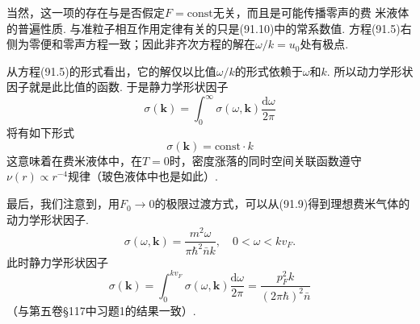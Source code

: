 当然，这一项的存在与是否假定$F=\mathrm{const}$无关，而且是可能传播零声的费
米液体的普遍性质. 与准粒子相互作用定律有关的只是(91.10)中的常系数值. 方程(91.5)右侧为零便和零声方程一致；因此非齐次方程的解在$\omega/k=u_{0}$处有极点.

从方程(91.5)的形式看出，它的解仅以比值$\omega/k$的形式依赖于$\omega$和$k$. 所以动力学形状因子就是此比值的函数. 于是静力学形状因子
\begin{equation*}
\sigma(\bm{k})=\int_{0}^{\infty}\sigma(\omega,\bm{k})\frac{\mathrm{d}\omega}{2\pi}
\end{equation*}
将有如下形式
\begin{equation}
\sigma(\bm{k})=\mathrm{const}\cdot k
\end{equation}
这意味着在费米液体中，在$T=0$时，密度涨落的同时空间关联函数遵守$\nu(r)\propto r^{-4}$规律（玻色液体中也是如此）.

最后，我们注意到，用$F_{0}\to0$的极限过渡方式，可以从(91.9)得到理想费米气体的动力学形状因子.
\begin{equation*}
\sigma(\omega,\bm{k})=\frac{m^{2}\omega}{\pi\hbar^{2}\bar{n}k},\quad0<\omega<kv_{F}.
\end{equation*}
此时静力学形状因子
\begin{equation*}
\sigma(\bm{k})=\int_{0}^{kv_{F}}\sigma(\omega,\bm{k})\frac{\mathrm{d}\omega}{2\pi}=\frac{p^{2}_{F}k}{(2\pi\hbar)^{2}\bar{n}}
\end{equation*}
（与第五卷§117中习题1的结果一致）.
